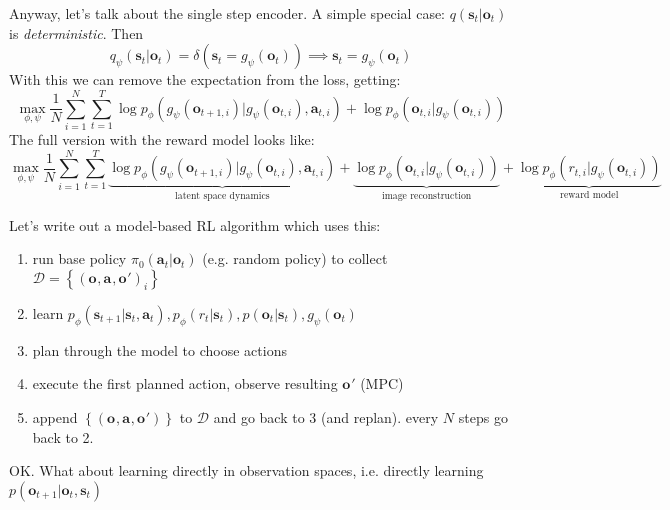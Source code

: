 \documentclass{report}
\begin{document}
Anyway, let's talk about the single step encoder.
A simple special case: $q(\bm{s}_{t}|\bm{o}_{t})$ is \textit{deterministic}. Then 
\begin{equation}
		q_\psi (\bm{s}_{t}|\bm{o}_{t}) =
		\delta (\bm{s}_{t} = g_\psi (\bm{o}_{t})) \implies \bm{s}_{t} = g_\psi (\bm{o}_{t})
\end{equation}
With this we can remove the expectation from the loss, getting:
\begin{equation}
		\max_{\phi, \psi} \frac{1}{N} \sum_{i=1}^{N} \sum_{t=1}^{T} \log p_\phi (g_\psi (\bm{o}_{t+1,i}) | g_\psi(\bm{o}_{t,i}), \bm{a}_{t,i})
		+ \log p_\phi (\bm{o}_{t,i}|g_\psi(\bm{o}_{t,i}))
\end{equation}
The full version with the reward model looks like:
\begin{equation}
		\max_{\phi, \psi} \frac{1}{N} \sum_{i=1}^{N} \sum_{t=1}^{T} 
		\underbrace{\log p_\phi (g_\psi (\bm{o}_{t+1,i}) | g_\psi(\bm{o}_{t,i}), \bm{a}_{t,i})}_{\text{latent space dynamics}}
		+ 
		\underbrace{\log p_\phi (\bm{o}_{t,i}|g_\psi(\bm{o}_{t,i}))}_{\text{image reconstruction}}
		+
		\underbrace{\log p_\phi (r_{t,i} | g_\psi (\bm{o}_{t,i}))}_{\text{reward model}}
\end{equation}

Let's write out a model-based RL algorithm which uses this:
\begin{enumerate}
		\item run base policy $ \pi_0 (\bm{a}_t| \bm{o}_t)  $ (e.g. random policy) to collect $ \mathcal{D} = \left\{ \left( \bm{o}_{}, \bm{a}_{}, \bm{o}_{}' \right)_i  \right\}  $ 
		\item learn $p_\phi \left( \bm{s}_{t+1}| \bm{s}_{t}, \bm{a}_{t} \right) , p_\phi(r_t|\bm{s}_{t}), p(\bm{o}_{t}|\bm{s}_{t}), g_\psi(\bm{o}_{t})$
		\item plan through the model to choose actions
		\item execute the first planned action, observe resulting $ \bm{o}_{}' $ (MPC)
		\item append $\left\{ \left( \bm{o}_{}, \bm{a}_{}, \bm{o}_{}' \right)  \right\}  $ to $\mathcal{D}$ and go back to 3 (and replan). every $N$ steps go back to 2.
\end{enumerate}

OK. What about learning directly in observation spaces,
i.e. directly learning $p(\bm{o}_{t+1}| \bm{o}_{t}, \bm{s}_{t})$
\end{document}

